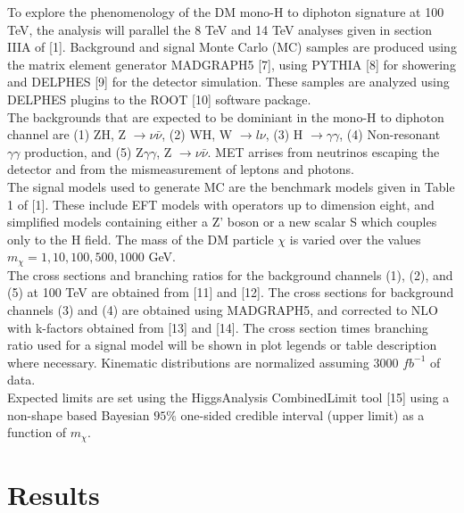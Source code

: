 \documentclass[twoside]{article}
\begin{document}
\begin{multicols}{2}
To explore the phenomenology of the DM mono-H to diphoton signature at 100 TeV, the analysis will parallel the 8 TeV and 14 TeV analyses given in section IIIA of [1]. Background and signal Monte Carlo (MC) samples are produced using the matrix element generator MADGRAPH5 [7], using PYTHIA [8] for showering and DELPHES [9] for the detector simulation. These samples are analyzed using DELPHES plugins to the ROOT [10] software package. \\
\indent The backgrounds that are expected to be dominiant in the mono-H to diphoton channel are (1) ZH, Z $\rightarrow \nu \bar{\nu}$, (2) WH, W $\rightarrow l \nu$, (3) H $\rightarrow \gamma \gamma$, (4) Non-resonant $\gamma \gamma$ production, and (5) Z$\gamma\gamma$, Z $\rightarrow \nu \bar{\nu}$. MET arrises from neutrinos escaping the detector and from the mismeasurement of leptons and photons. \\
\indent The signal models used to generate MC are the benchmark models given in Table 1 of [1]. These include EFT models with operators up to dimension eight, and simplified models containing either a Z' boson or a new scalar S which couples only to the H field. The mass of the DM particle $\chi$ is varied over the values $m_{\chi} = 1, 10, 100, 500, 1000$ GeV. \\
\indent The cross sections and branching ratios for the background channels (1), (2), and (5) at 100 TeV are obtained from [11] and [12]. The cross sections for background channels (3) and (4) are obtained using MADGRAPH5, and corrected to NLO with k-factors obtained from [13] and [14]. The cross section times branching ratio used for a signal model will be shown in plot legends or table description where necessary. Kinematic distributions are normalized assuming 3000 $fb^{-1}$ of data. \\
\indent Expected limits are set using the HiggsAnalysis CombinedLimit tool [15] using a non-shape based
Bayesian $95\%$ one-sided credible interval (upper limit) as a function of $m_{\chi}$. \\


\section{Results}


\end{multicols}
\end{document}
